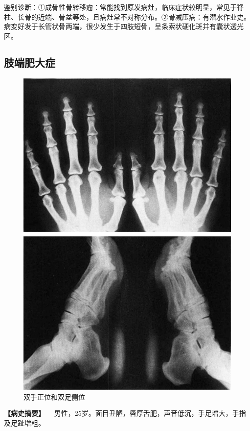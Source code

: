 鉴别诊断：①成骨性骨转移瘤：常能找到原发病灶，临床症状较明显，常见于脊柱、长骨的近端、骨盆等处，且病灶常不对称分布。②骨减压病：有潜水作业史。病变好发于长管状骨两端，很少发生于四肢短骨，呈条索状硬化斑并有囊状透光区。

\subsection{肢端肥大症}

\begin{figure}[!htbp]
 \centering
 \includegraphics{./images/Image00125.jpg}
 \captionsetup{justification=centering}
 \caption{双手正位和双足侧位}
 \label{fig2-8-11}
  \end{figure} 

\textbf{【病史摘要】}
　男性，25岁。面目丑陋，唇厚舌肥，声音低沉，手足增大，手指及足趾增粗。


